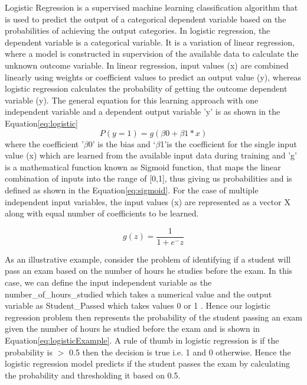 \documentclass[11pt,openright]{report}
\begin{document}
Logistic Regression is a supervised machine learning classification algorithm that is used to predict the output of a categorical dependent variable based on the probabilities of achieving the output categories. In logistic regression, the dependent variable is a categorical variable. It is a variation of linear regression, where a model is constructed in supervision of the available data to calculate the unknown outcome variable. In linear regression, input values (x) are combined linearly using weights or coefficient values to predict an output value (y), whereas logistic regression calculates the probability of getting the outcome dependent variable (y). The general equation for this learning approach with one independent variable and a dependent output variable 'y' is as shown in the Equation\ref{eq:logistic} 
\begin{equation}
 P(y=1)= g(\beta0+\beta1 *x )  \label{eq:logistic} 
 \end{equation}
 where the coefficient '$\beta$0' is the bias and \lq$\beta$1\rq  is the coefficient for the single input value (x) which are learned from the available input data during training and 'g' is a mathematical function known as Sigmoid function, that maps the linear combination of inputs into the range of [0,1], thus giving us probabilities and is defined as shown in the Equation\ref{eq:sigmoid}. For the case of multiple independent input variables, the input values (x) are represented as a vector X along with equal number of coefficients to be learned.
 
\begin{equation}
 g(z) =  \frac{\mathrm{1} }{\mathrm{1} + e^- z }  \label{eq:sigmoid} 
 \end{equation}

As an illustrative example, consider the problem of identifying if a student will pass an exam based on the number of hours he studies before the exam. In this case, we can define the input independent variable as the number\_of\_hours\_studied which takes a numerical value and the output variable as Student\_Passed which takes values { 0 or 1 }. Hence our logistic regression problem then represents the probability of the student passing an exam given the number of hours he studied before the exam and is shown in Equation\ref{eq:logisticExample}. A rule of thumb in logistic regression is if the probability is $>$ 0.5 then the decision is true i.e. {1} and {0} otherwise. Hence the logistic regression model predicts if the student passes the exam by calculating the probability and thresholding it based on 0.5.
\end{document}
